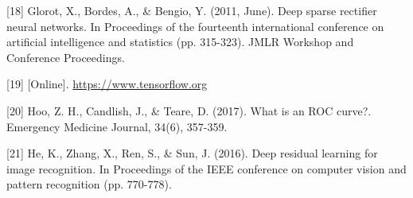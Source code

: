 \documentclass[11pt]{article}
\begin{document}
[18] Glorot, X., Bordes, A., \& Bengio, Y. (2011, June). Deep sparse rectifier neural networks. In Proceedings of the fourteenth international conference on artificial intelligence and statistics (pp. 315-323). JMLR Workshop and Conference Proceedings.

[19] [Online]. \url{https://www.tensorflow.org}

[20] Hoo, Z. H., Candlish, J., \& Teare, D. (2017). What is an ROC curve?. Emergency Medicine Journal, 34(6), 357-359.

[21] He, K., Zhang, X., Ren, S., \& Sun, J. (2016). Deep residual learning for image recognition. In Proceedings of the IEEE conference on computer vision and pattern recognition (pp. 770-778).
\end{document}
